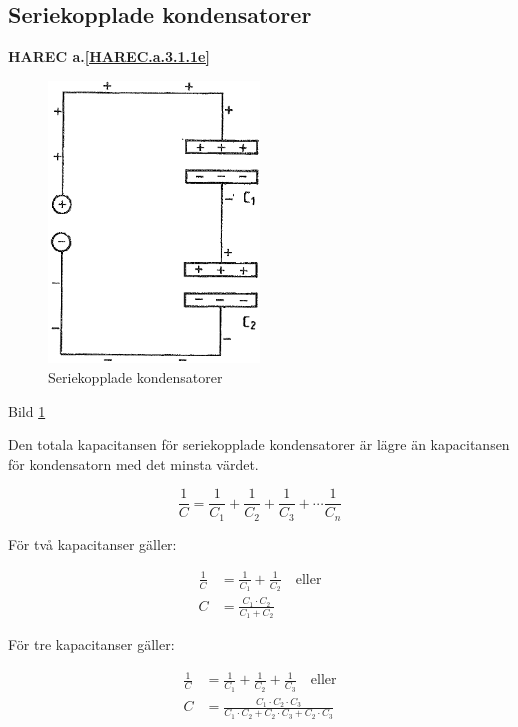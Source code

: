 \subsection{Seriekopplade kondensatorer}
\textbf{HAREC a.\ref{HAREC.a.3.1.1e}\label{myHAREC.a.3.1.1e}}

\begin{figure}
\includegraphics[width=0.5\textwidth]{images/bild_2_3-06.png}
\caption{Seriekopplade kondensatorer}
\label{fig:BildII3-06}
\end{figure}

Bild \ref{fig:BildII3-06}

Den totala kapacitansen för seriekopplade kondensatorer är lägre än kapacitansen
för kondensatorn med det minsta värdet.

\[
\frac{1}{C} = \frac{1}{C_1} + \frac{1}{C_2} +
\frac{1}{C_3} + \cdots \frac{1}{C_n}
\]

För två kapacitanser gäller:

\begin{align*}
  \frac{1}{C} &= \frac{1}{C_1} + \frac{1}{C_2} \quad \text{eller} \\
  C &= \frac{C_1 \cdot C_2}{C_1 + C_2}
\end{align*}

För tre kapacitanser gäller:

\begin{align*}
  \frac{1}{C} &= \frac{1}{C_1} + \frac{1}{C_2} + \frac{1}{C_3}
  \quad \text{eller} \\
  C &= \frac{C_1 \cdot C_2 \cdot C_3}
  {C_1 \cdot C_2 + C_2 \cdot C_3 + C_2 \cdot C_3}
\end{align*}

